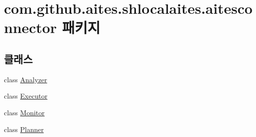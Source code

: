 \hypertarget{namespacecom_1_1github_1_1aites_1_1shlocalaites_1_1aitesconnector}{}\section{com.\+github.\+aites.\+shlocalaites.\+aitesconnector 패키지}
\label{namespacecom_1_1github_1_1aites_1_1shlocalaites_1_1aitesconnector}
\subsection*{클래스}
\begin{DoxyCompactItemize}
\item 
class \mbox{\hyperlink{classcom_1_1github_1_1aites_1_1shlocalaites_1_1aitesconnector_1_1_analyzer}{Analyzer}}
\item 
class \mbox{\hyperlink{classcom_1_1github_1_1aites_1_1shlocalaites_1_1aitesconnector_1_1_executor}{Executor}}
\item 
class \mbox{\hyperlink{classcom_1_1github_1_1aites_1_1shlocalaites_1_1aitesconnector_1_1_monitor}{Monitor}}
\item 
class \mbox{\hyperlink{classcom_1_1github_1_1aites_1_1shlocalaites_1_1aitesconnector_1_1_planner}{Planner}}
\end{DoxyCompactItemize}
